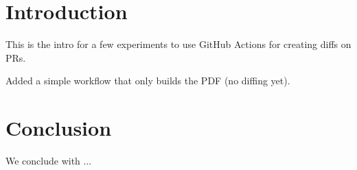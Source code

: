 \documentclass{article}
\begin{document}
\section{Introduction}
\label{sec:introduction}
This is the intro for a few experiments to use GitHub Actions for creating diffs on PRs.

Added a simple workflow that only builds the PDF (no diffing yet).



\section{Conclusion}
\label{sec:conclusion}
We conclude with ...
\end{document}
